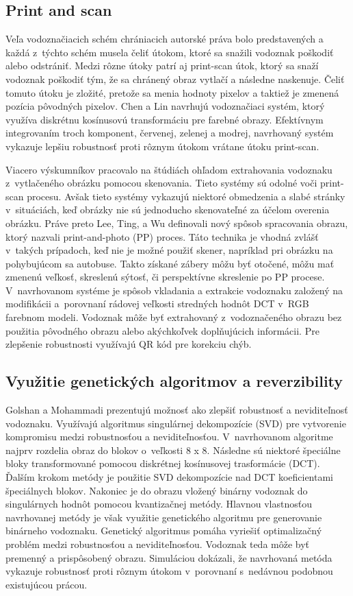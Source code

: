 \subsection{Print and scan}
Veľa vodoznačiacich schém chrániacich autorské práva bolo predstavených a každá z~týchto schém musela čeliť útokom, ktoré sa snažili vodoznak poškodiť alebo odstrániť. Medzi rôzne útoky patrí aj print-scan útok, ktorý sa snaží vodoznak poškodiť tým, že sa chránený obraz vytlačí a následne naskenuje. Čeliť tomuto útoku je zložité, pretože sa menia hodnoty pixelov a taktiež je zmenená pozícia pôvodných pixelov. Chen a Lin \cite{Chen} navrhujú vodoznačiaci systém, ktorý využíva diskrétnu kosínusovú transformáciu pre farebné obrazy. Efektívnym integrovaním troch komponent, červenej, zelenej a modrej, navrhovaný systém vykazuje lepšiu robustnosť proti rôznym útokom vrátane útoku print-scan.

Viacero výskumníkov pracovalo na štúdiách ohľadom extrahovania vodoznaku z~vytlačeného obrázku pomocou skenovania. Tieto systémy sú odolné voči print-scan procesu. Avšak tieto systémy vykazujú niektoré obmedzenia a slabé stránky v~situáciách, keď obrázky nie sú jednoducho skenovateľné za účelom overenia obrázku. Práve preto Lee, Ting, a Wu \cite{Lee2016} definovali nový spôsob spracovania obrazu, ktorý nazvali print-and-photo (PP) proces. Táto technika je vhodná zvlášť v~takých prípadoch, keď nie je možné použiť skener, napríklad pri obrázku na pohybujúcom sa autobuse. Takto získané zábery môžu byť otočené, môžu mať zmenenú veľkosť, skreslenú sýtosť, či perspektívne skreslenie po PP procese. V~navrhovanom systéme je spôsob vkladania a extrakcie vodoznaku založený na modifikácii a~porovnaní rádovej veľkosti stredných hodnôt DCT v~RGB farebnom modeli. Vodoznak môže byť extrahovaný z~vodoznačeného obrazu bez použitia pôvodného obrazu alebo akýchkoľvek doplňujúcich informácii. Pre zlepšenie robustnosti využívajú QR kód pre korekciu chýb.

\subsection{Využitie genetických algoritmov a reverzibility}
Golshan a Mohammadi \cite{Golshan} prezentujú možnosť ako zlepšiť robustnosť a neviditeľnosť vodoznaku. Využívajú algoritmus singulárnej dekompozície (SVD) pre vytvorenie kompromisu medzi robustnosťou a neviditeľnosťou. V~navrhovanom algoritme najprv rozdelia obraz do blokov o~veľkosti 8 x 8. Následne sú niektoré špeciálne bloky transformované pomocou diskrétnej kosínusovej trasformácie (DCT). Ďalším krokom metódy je použitie SVD dekompozície nad DCT koeficientami špeciálnych blokov. Nakoniec je do obrazu vložený binárny vodoznak do singulárnych hodnôt pomocou kvantizačnej metódy. Hlavnou vlastnosťou navrhovanej metódy je však využitie genetického algoritmu pre generovanie binárneho vodoznaku. Genetický algoritmus pomáha vyriešiť optimalizačný problém medzi robustnosťou a neviditeľnosťou. Vodoznak teda môže byť premenný a prispôsobený obrazu. Simuláciou dokázali, že navrhovaná metóda vykazuje robustnosť proti rôznym útokom v~porovnaní s~nedávnou podobnou existujúcou prácou.

